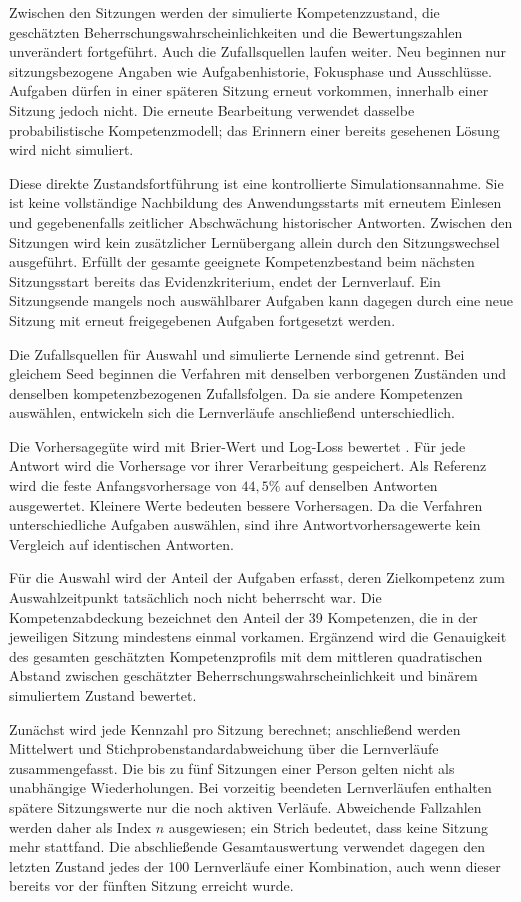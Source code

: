Zwischen den Sitzungen werden der simulierte Kompetenzzustand, die
geschätzten Beherrschungswahrscheinlichkeiten und die Bewertungszahlen
unverändert fortgeführt. Auch die Zufallsquellen laufen weiter. Neu
beginnen nur sitzungsbezogene Angaben wie Aufgabenhistorie, Fokusphase
und Ausschlüsse. Aufgaben dürfen in einer späteren Sitzung erneut
vorkommen, innerhalb einer Sitzung jedoch nicht. Die erneute Bearbeitung
verwendet dasselbe probabilistische Kompetenzmodell; das Erinnern einer
bereits gesehenen Lösung wird nicht simuliert.

Diese direkte Zustandsfortführung ist eine kontrollierte
Simulationsannahme. Sie ist keine vollständige Nachbildung des
Anwendungsstarts mit erneutem Einlesen und gegebenenfalls zeitlicher
Abschwächung historischer Antworten. Zwischen den Sitzungen wird kein
zusätzlicher Lernübergang allein durch den Sitzungswechsel ausgeführt.
Erfüllt der gesamte geeignete Kompetenzbestand beim nächsten
Sitzungsstart bereits das Evidenzkriterium, endet der Lernverlauf.
Ein Sitzungsende mangels noch auswählbarer Aufgaben kann dagegen durch
eine neue Sitzung mit erneut freigegebenen Aufgaben fortgesetzt werden.

Die Zufallsquellen für Auswahl und simulierte Lernende sind getrennt.
Bei gleichem Seed beginnen die Verfahren mit denselben verborgenen
Zuständen und denselben kompetenzbezogenen Zufallsfolgen. Da sie andere
Kompetenzen auswählen, entwickeln sich die Lernverläufe anschließend
unterschiedlich.

Die Vorhersagegüte wird mit Brier-Wert und Log-Loss bewertet
\cite{brier1950verification,pelanek2015metrics}. Für jede Antwort wird die
Vorhersage vor ihrer Verarbeitung gespeichert. Als Referenz wird die
feste Anfangsvorhersage von $44{,}5\%$ auf denselben Antworten ausgewertet.
Kleinere Werte bedeuten bessere Vorhersagen. Da die Verfahren
unterschiedliche Aufgaben auswählen, sind ihre Antwortvorhersagewerte
kein Vergleich auf identischen Antworten.

Für die Auswahl wird der Anteil der Aufgaben erfasst, deren Zielkompetenz
zum Auswahlzeitpunkt tatsächlich noch nicht beherrscht war. Die
Kompetenzabdeckung bezeichnet den Anteil der 39 Kompetenzen, die in der
jeweiligen Sitzung mindestens einmal vorkamen. Ergänzend wird die
Genauigkeit des gesamten geschätzten Kompetenzprofils mit dem mittleren
quadratischen Abstand zwischen geschätzter Beherrschungswahrscheinlichkeit
und binärem simuliertem Zustand bewertet.

Zunächst wird jede Kennzahl pro Sitzung berechnet; anschließend werden
Mittelwert und Stichprobenstandardabweichung über die Lernverläufe
zusammengefasst. Die bis zu fünf Sitzungen einer Person gelten nicht als
unabhängige Wiederholungen. Bei vorzeitig beendeten Lernverläufen enthalten
spätere Sitzungswerte nur die noch aktiven Verläufe. Abweichende Fallzahlen
werden daher als Index $n$ ausgewiesen; ein Strich bedeutet, dass keine
Sitzung mehr stattfand. Die abschließende Gesamtauswertung verwendet
dagegen den letzten Zustand jedes der 100 Lernverläufe einer Kombination,
auch wenn dieser bereits vor der fünften Sitzung erreicht wurde.


